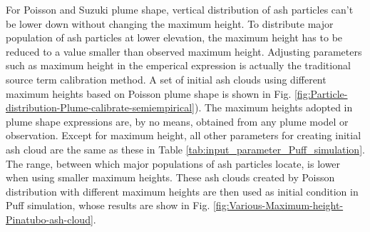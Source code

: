 \documentclass[draft,linenumbers]{agujournal2019}
\begin{document}
For Poisson and Suzuki plume shape, vertical distribution of ash particles can't be lower down without changing the maximum height. To distribute major population of ash particles at lower elevation, the maximum height has to be reduced to a value smaller than observed maximum height. Adjusting parameters such as maximum height in the emperical expression is actually the traditional source term calibration method. A set of initial ash clouds using different maximum heights based on Poisson plume shape is shown in Fig. \ref{fig:Particle-distribution-Plume-calibrate-semiempirical}). The maximum heights adopted in plume shape expressions are, by no means, obtained from any plume model or observation. Except for maximum height, all other parameters for creating initial ash cloud are the same as these in Table \ref{tab:input_parameter_Puff_simulation}. The range, between which major populations of ash particles locate, is lower when using smaller maximum heights. These ash clouds created by Poisson distribution with different maximum heights are then used as initial condition in Puff simulation, whose results are show in Fig. \ref{fig:Various-Maximum-height-Pinatubo-ash-cloud}.
\end{document}
